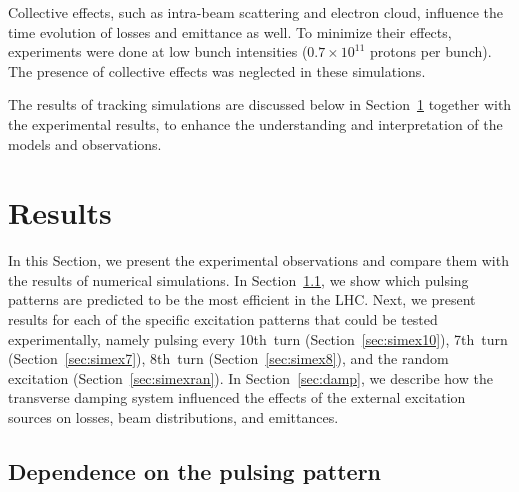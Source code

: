 \documentclass[aps
,prstab
,reprint
,longbibliography
,preprintnumbers
,showkeys
,amsfonts,amssymb,amsmath
,floatfix
]{revtex4-1}
\begin{document}
Collective effects, such as intra-beam scattering and electron cloud,
influence the time evolution of losses and emittance as well. To
minimize their effects, experiments were done at low bunch intensities
($0.7 \times 10^{11}$ protons per bunch). The presence of collective
effects was neglected in these simulations.

The results of tracking simulations are discussed below in
Section~\ref{sec:simex} together with the experimental results, to
enhance the understanding and interpretation of the models and
observations.



\section{Results}
\label{sec:simex}

In this Section, we present the experimental observations and compare
them with the results of numerical simulations.  In
Section~\ref{sec:pattern}, we show which pulsing patterns are
predicted to be the most efficient in the LHC.  Next, we present
results for each of the specific excitation patterns that could be
tested experimentally, namely pulsing every 10th~turn
(Section~\ref{sec:simex10}), 7th~turn (Section~\ref{sec:simex7}),
8th~turn (Section~\ref{sec:simex8}), and the random excitation
(Section~\ref{sec:simexran}).  In Section~\ref{sec:damp}, we describe
how the transverse damping system influenced the effects of the
external excitation sources on losses, beam distributions, and
emittances.


\subsection{Dependence on the pulsing pattern}
\label{sec:pattern}
\end{document}
